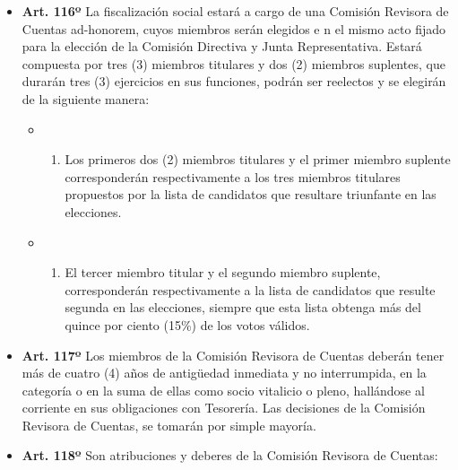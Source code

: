 \documentclass[]{book}
\providecommand{\tightlist}{%
  \setlength{\itemsep}{0pt}\setlength{\parskip}{0pt}}
\begin{document}
\begin{itemize}
\item
  \textbf{Art. 116º} La fiscalización social estará a cargo de una
  Comisión Revisora de Cuentas ad-honorem, cuyos miembros serán elegidos
  e n el mismo acto fijado para la elección de la Comisión Directiva y
  Junta Representativa. Estará compuesta por tres (3) miembros titulares
  y dos (2) miembros suplentes, que durarán tres (3) ejercicios en sus
  funciones, podrán ser reelectos y se elegirán de la siguiente manera:

  \begin{itemize}
  \item
    \begin{enumerate}
    \def\labelenumi{\alph{enumi})}
    \tightlist
    \item
      Los primeros dos (2) miembros titulares y el primer miembro
      suplente corresponderán respectivamente a los tres miembros
      titulares propuestos por la lista de candidatos que resultare
      triunfante en las elecciones.
    \end{enumerate}
  \item
    \begin{enumerate}
    \def\labelenumi{\alph{enumi})}
    \setcounter{enumi}{1}
    \tightlist
    \item
      El tercer miembro titular y el segundo miembro suplente,
      corresponderán respectivamente a la lista de candidatos que
      resulte segunda en las elecciones, siempre que esta lista obtenga
      más del quince por ciento (15\%) de los votos válidos.
    \end{enumerate}
  \end{itemize}
\item
  \textbf{Art. 117º} Los miembros de la Comisión Revisora de Cuentas
  deberán tener más de cuatro (4) años de antigüedad inmediata y no
  interrumpida, en la categoría o en la suma de ellas como socio
  vitalicio o pleno, hallándose al corriente en sus obligaciones con
  Tesorería. Las decisiones de la Comisión Revisora de Cuentas, se
  tomarán por simple mayoría.
\item
  \textbf{Art. 118º} Son atribuciones y deberes de la Comisión Revisora
  de Cuentas:


\end{itemize}
\end{document}
